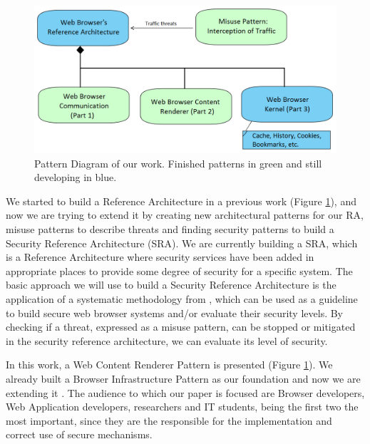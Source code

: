 \documentclass[prodmode,acmtecs]{acmsmall}
\begin{document}
    \begin{figure}[h!t]
      \vspace*{-0.5cm}
      \centering
      \hspace{0.5cm}\includegraphics[scale=0.42]{figures/relations-finish.png}
      \caption{Pattern Diagram of our work. Finished patterns in green and still developing in blue.}
      \label{fig:relations}
    \end{figure}

We started to build a Reference Architecture in a previous work (Figure \ref{fig:relations}), and now we are trying to extend it by creating new architectural patterns for our RA, misuse patterns to describe threats and finding security patterns to build a Security Reference Architecture (SRA). We are currently building a SRA, which is a Reference Architecture where security services have been added in appropriate places to provide some degree of security for a specific system. The basic approach we will use to build a Security Reference Architecture is the application of a systematic methodology from \cite{fernandez2006methodology,Fernandez2011,Fernandez2015}, which can be used as a guideline to build secure web browser systems and/or evaluate their security levels. By checking if a threat, expressed as a misuse pattern, can be stopped or mitigated in the security reference architecture, we can evaluate its level of security.

In this work, a Web Content Renderer Pattern is presented (Figure \ref{fig:relations}). We already built a Browser Infrastructure Pattern as our foundation and now we are extending it \cite{silva2015}. The audience to which our paper is focused are Browser developers, Web Application developers, researchers and IT students, being the first two the most important, since they are the responsible for the implementation and correct use of secure mechanisms. 
\end{document}
